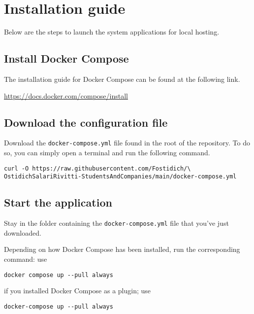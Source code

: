 \chapter{Installation guide}

Below are the steps to launch the system applications for local hosting.

\section{Install Docker Compose}

The installation guide for Docker Compose can be found at the following link.

\begin{center}
\url{https://docs.docker.com/compose/install}
\end{center}

\section{Download the configuration file}

Download the \verb|docker-compose.yml| file found in the root of the repository.
To do so, you can simply open a terminal and run the following command.

\begin{center}
\verb|curl -O https://raw.githubusercontent.com/Fostidich/\| \\
\verb|OstidichSalariRivitti-StudentsAndCompanies/main/docker-compose.yml|
\end{center}

\section{Start the application}

Stay in the folder containing the \verb|docker-compose.yml| file that you've just downloaded.

Depending on how Docker Compose has been installed, run the corresponding command: use

\begin{center}
\verb|docker compose up --pull always|
\end{center}

if you installed Docker Compose as a plugin; use

\begin{center}
\verb|docker-compose up --pull always|
\end{center}


